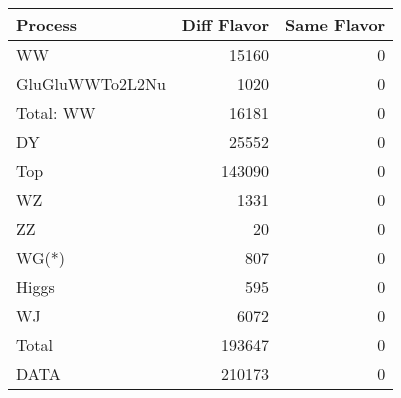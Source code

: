 \begin{table}[ht]
	\centering
\begin{tabular}{lrr}

         Process &  Diff Flavor &  Same Flavor \\
		\hline
              WW &        15160 &            0 \\
 GluGluWWTo2L2Nu &         1020 &            0 \\
\hline
       Total: WW &        16181 &            0 \\
              DY &        25552 &            0 \\
             Top &       143090 &            0 \\
              WZ &         1331 &            0 \\
              ZZ &           20 &            0 \\
           WG(*) &          807 &            0 \\
           Higgs &          595 &            0 \\
              WJ &         6072 &            0 \\
\hline
           Total &       193647 &            0 \\
            DATA &       210173 &            0 \\


\end{tabular}

\end{table}